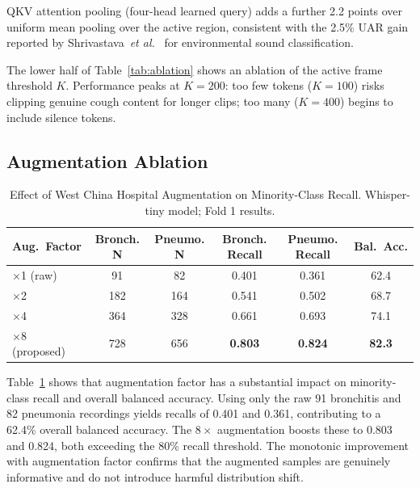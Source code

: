 \documentclass[10pt,journal,compsoc]{IEEEtran}
\begin{document}
QKV attention pooling (four-head learned query) adds a further 2.2 points
over uniform mean pooling over the active region, consistent with the
2.5\% UAR gain reported by Shrivastava~\textit{et al.}~\cite{whisper_audio_cls}
for environmental sound classification.

The lower half of Table~\ref{tab:ablation} shows an ablation of the
active frame threshold $K$. Performance peaks at $K=200$:
too few tokens ($K=100$) risks clipping genuine cough content for
longer clips; too many ($K=400$) begins to include silence tokens.

\subsection{Augmentation Ablation}

\begin{table}[!t]
\caption{Effect of West China Hospital Augmentation on Minority-Class Recall.
         Whisper-tiny model; Fold 1 results.}
\label{tab:aug_ablation}
\centering
\setlength{\tabcolsep}{5pt}
\begin{tabular}{lccccc}
\toprule
\textbf{Aug.\ Factor} & \textbf{Bronch. N} & \textbf{Pneumo. N}
                      & \textbf{Bronch. Recall} & \textbf{Pneumo. Recall}
                      & \textbf{Bal.\ Acc.} \\
\midrule
$\times$1 (raw)      & 91  & 82  & 0.401 & 0.361 & 62.4 \\
$\times$2            & 182 & 164 & 0.541 & 0.502 & 68.7 \\
$\times$4            & 364 & 328 & 0.661 & 0.693 & 74.1 \\
$\times$8 (proposed) & 728 & 656 & \textbf{0.803} & \textbf{0.824} & \textbf{82.3} \\
\bottomrule
\end{tabular}
\end{table}

Table~\ref{tab:aug_ablation} shows that augmentation factor has a
substantial impact on minority-class recall and overall balanced accuracy.
Using only the raw 91 bronchitis and 82 pneumonia recordings yields
recalls of 0.401 and 0.361, contributing to a 62.4\% overall balanced
accuracy. The $8\times$ augmentation boosts these to 0.803 and 0.824,
both exceeding the 80\% recall threshold.
The monotonic improvement with augmentation factor confirms that the
augmented samples are genuinely informative and do not introduce
harmful distribution shift.

\end{document}
